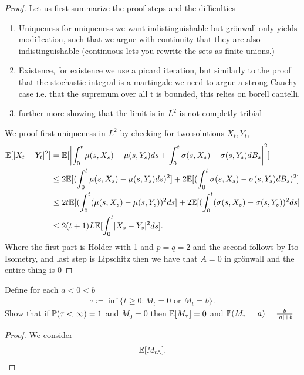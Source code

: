 \begin{proof}
  Let us first summarize the proof steps and the difficulties 
  \begin{enumerate}
    \item Uniqueness for uniqueness we want indistinguishable but grönwall only yields modification, 
      such that we argue with continuity that they are also indistinguishable (continuous lets you rewrite the sets as finite unions.)
    \item Existence, for existence we use a picard iteration,  but similarly to the proof that the stochastic integral is a martingale 
      we need to argue a strong Cauchy case i.e. that the supremum over all t is bounded, this relies on borell cantelli.
    \item further more showing that the limit is in $L^2$ is not completly tribial
  \end{enumerate}
 We proof first uniqueness in $L^2$ by checking  for two solutions $X_t , Y_t$,
 \begin{align*}
   \E[\abs{X_t-Y_t}^2]  &=\E[\abs*{\int_0^{t} \mu(s,X_s)-\mu(s,Y_s) ds + \int_0^{t} \sigma(s,X_s) -\sigma(s,Y_s) dB_s }^2 ]\\
                        &\le 2\E[(\int_0^{t}\mu(s,X_s) - \mu(s,Y_s) ds )^2] + 2\E[(\int_0^{t}\sigma (s,X_s) - \sigma(s,Y_s) dB_s )^2]\\
                        &\le 2t\E[(\int_0^{t}(\mu(s,X_s) - \mu(s,Y_s))^2 ds] + 2\E[(\int_0^{t}(\sigma (s,X_s) - \sigma(s,Y_s))^2 ds ]\\
                        &\le 2(t+1)L\E[\int_0^{t} \abs{X_s-Y_s}^2 ds ]
 .\end{align*}
 Where the first part is Hölder with 1 and $p=q=2$ and the second follows by Ito Isometry, and last step is Lipschitz
 then we have that $A=0$ in grönwall and the entire thing is $0$
\end{proof}
\begin{exercise}
 Define for each $a < 0 < b$  
 \begin{align*}
  \tau  \coloneqq  \inf \{t\ge 0 : M_t = 0 \text{ or } M_t = b\}  
 .\end{align*}
 Show that if $\P(\tau  < \infty) = 1$ and $M_{0}  = 0$ then $\E[M_{\tau }] = 0$ and $\P(M_{\tau } = a) = \frac{b}{\abs{a}+b}$
\end{exercise}
\begin{proof}
 We consider 
 \begin{align*}
   \E[M_{t \land }]
 .\end{align*}
\end{proof}
